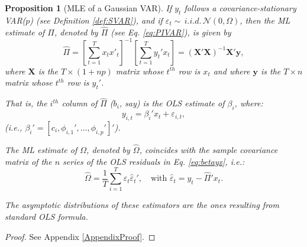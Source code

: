 \documentclass[
  11pt,
]{book}
\newtheorem{proposition}{Proposition}[chapter]
\theoremstyle{definition}
\theoremstyle{definition}
\theoremstyle{definition}
\theoremstyle{definition}
\theoremstyle{remark}
\begin{document}
\begin{proposition}[MLE of a Gaussian VAR]
\protect\hypertarget{prp:estimVARGaussian}{}\label{prp:estimVARGaussian}If \(y_t\) follows a covariance-stationary VAR(\(p\)) (see Definition \ref{def:SVAR}), and if \(\varepsilon_t \sim \,i.i.d.\,\mathcal{N}(0,\Omega)\), then the ML estimate of \(\Pi\), denoted by \(\hat{\Pi}\) (see Eq. \eqref{eq:PIVAR}), is given by
\begin{equation}
\hat{\Pi}=\left[\sum_{t=1}^{T}x_{t}x'_{t}\right]^{-1}\left[\sum_{t=1}^{T}y_{t}'x_{t}\right]= (\mathbf{X}'\mathbf{X})^{-1}\mathbf{X}'\mathbf{y},
\label{eq:Pi}
\end{equation}
where \(\mathbf{X}\) is the \(T \times (1+np)\) matrix whose \(t^{th}\) row is \(x_t\) and where \(\mathbf{y}\) is the \(T \times n\) matrix whose \(t^{th}\) row is \(y_{t}'\).

That is, the \(i^{th}\) column of \(\hat{\Pi}\) (\(b_i\), say) is the OLS estimate of \(\beta_i\), where:
\begin{equation}
y_{i,t} = \beta_i'x_t + \varepsilon_{i,t},
\label{eq:betayx}
\end{equation}
(i.e., \(\beta_i' = [c_i,\phi_{i,1}',\dots,\phi_{i,p}']'\)).

The ML estimate of \(\Omega\), denoted by \(\hat{\Omega}\), coincides with the sample covariance matrix of the \(n\) series of the OLS residuals in Eq. \eqref{eq:betayx}, i.e.:
\begin{equation}
\hat{\Omega} = \frac{1}{T} \sum_{i=1}^T \hat{\varepsilon}_t\hat{\varepsilon}_t',\quad\mbox{with } \hat{\varepsilon}_t= y_t - \hat{\Pi}'x_t.
\end{equation}

The asymptotic distributions of these estimators are the ones resulting from standard OLS formula.
\end{proposition}

\begin{proof}
See Appendix \ref{AppendixProof}.
\end{proof}
\end{document}
